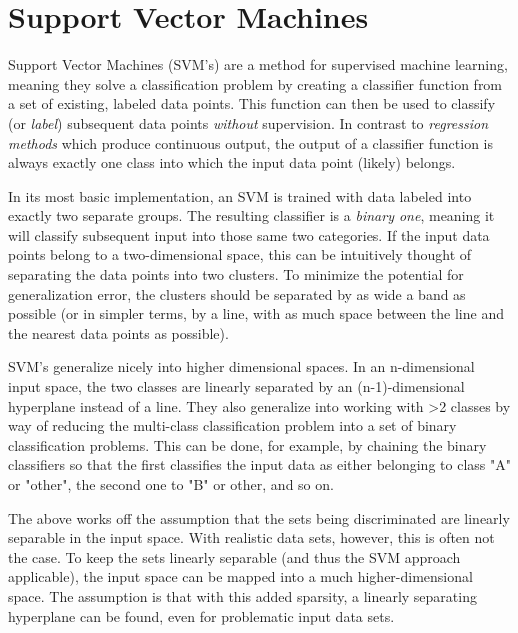 \documentclass{netsec2012}
\begin{document}
\section{Support Vector Machines}

Support Vector Machines (SVM's) are a method for supervised machine learning, meaning they solve a
classification problem by creating a classifier function from a set of existing, labeled data
points.  This function can then be used to classify (or \emph{label}) subsequent data points
\emph{without} supervision.  In contrast to \emph{regression methods} which produce continuous
output, the output of a classifier function is always exactly one class into which the input data
point (likely) belongs.

In its most basic implementation, an SVM is trained with data labeled into exactly two separate
groups.  The resulting classifier is a \emph{binary one}, meaning it will classify subsequent input
into those same two categories.  If the input data points belong to a two-dimensional space, this
can be intuitively thought of separating the data points into two clusters.  To minimize the
potential for generalization error, the clusters should be separated by as wide a band as possible
(or in simpler terms, by a line, with as much space between the line and the nearest data points as
possible).

SVM's generalize nicely into higher dimensional spaces.  In an n-dimensional input space, the two
classes are linearly separated by an (n-1)-dimensional hyperplane instead of a line.  They also
generalize into working with >2 classes by way of reducing the multi-class classification problem
into a set of binary classification problems.  This can be done, for example, by chaining the binary
classifiers so that the first classifies the input data as either belonging to class "A" or "other",
the second one to "B" or other, and so on.

The above works off the assumption that the sets being discriminated are linearly separable in the
input space.  With realistic data sets, however, this is often not the case.  To keep the sets
linearly separable (and thus the SVM approach applicable), the input space can be mapped into a much
higher-dimensional space.  The assumption is that with this added sparsity, a linearly separating
hyperplane can be found, even for problematic input data sets.
\end{document}
